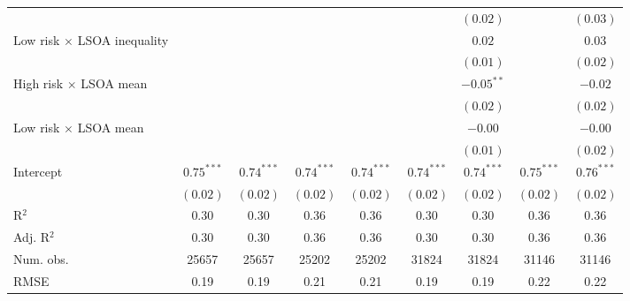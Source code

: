 \documentclass[12pt, letter]{scrartcl}
\begin{document}
\begin{table}[t]
{\begin{tabular}{l c c c c c c c c}
                                            &               &               &               &               &               & $(0.02)$      &               & $(0.03)$      \\
Low risk $\times$ LSOA inequality           &               &               &               &               &               & $0.02$        &               & $0.03$        \\
                                            &               &               &               &               &               & $(0.01)$      &               & $(0.02)$      \\
High risk $\times$ LSOA mean                &               &               &               &               &               & $-0.05^{**}$  &               & $-0.02$       \\
                                            &               &               &               &               &               & $(0.02)$      &               & $(0.02)$      \\
Low risk $\times$ LSOA mean                 &               &               &               &               &               & $-0.00$       &               & $-0.00$       \\
                                            &               &               &               &               &               & $(0.01)$      &               & $(0.02)$      \\
Intercept                                   & $0.75^{***}$  & $0.74^{***}$  & $0.74^{***}$  & $0.74^{***}$  & $0.74^{***}$  & $0.74^{***}$  & $0.75^{***}$  & $0.76^{***}$  \\
                                            & $(0.02)$      & $(0.02)$      & $(0.02)$      & $(0.02)$      & $(0.02)$      & $(0.02)$      & $(0.02)$      & $(0.02)$      \\
\hline
R$^2$                                       & 0.30          & 0.30          & 0.36          & 0.36          & 0.30          & 0.30          & 0.36          & 0.36          \\
Adj. R$^2$                                  & 0.30          & 0.30          & 0.36          & 0.36          & 0.30          & 0.30          & 0.36          & 0.36          \\
Num. obs.                                   & 25657         & 25657         & 25202         & 25202         & 31824         & 31824         & 31146         & 31146         \\
RMSE                                        & 0.19          & 0.19          & 0.21          & 0.21          & 0.19          & 0.19          & 0.22          & 0.22          \\

\end{tabular}}
\end{table}
\end{document}
